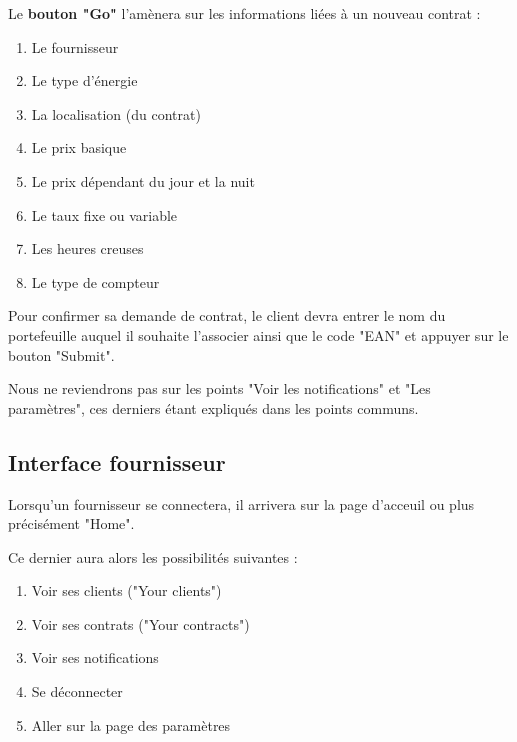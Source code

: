 \begin{flushleft}
Le \textbf{bouton "Go"} l'amènera sur les informations liées à un nouveau contrat :
\end{flushleft}
\begin{enumerate}
\item Le fournisseur
\item Le type d'énergie
\item La localisation (du contrat)
\item Le prix basique
\item Le prix dépendant du jour et la nuit
\item Le taux fixe ou variable
\item Les heures creuses
\item Le type de compteur
\end{enumerate}
\begin{flushleft}
Pour confirmer sa demande de contrat, le client devra entrer le nom du portefeuille auquel il souhaite l'associer ainsi que le code "EAN" et appuyer sur le bouton "Submit".
\end{flushleft}

\begin{flushleft}
Nous ne reviendrons pas sur les points "Voir les notifications" et "Les paramètres", ces derniers étant expliqués dans les points communs. 
\end{flushleft}

\newpage


\newpage
\subsection{Interface fournisseur}

Lorsqu'un fournisseur se connectera, il arrivera sur la page d'acceuil ou plus précisément "Home".
\begin{flushleft}
Ce dernier aura alors les possibilités suivantes :
\end{flushleft}
\begin{enumerate}
\item Voir ses clients ("Your clients")
\item Voir ses contrats ("Your contracts")
\item Voir ses notifications
\item Se déconnecter
\item Aller sur la page des paramètres
\end{enumerate}

